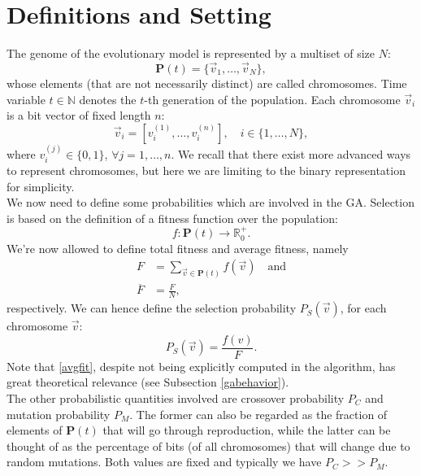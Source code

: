 \documentclass[%
    corpo=11pt,
    twoside,
    stile=classica,
    oldstyle,
    autoretitolo,
    tipotesi=magistrale,
    greek,
    evenboxes,
    english
]{toptesi}
\begin{document}
\section{Definitions and Setting}
The genome of the evolutionary model is represented by a multiset of size $N$:
\begin{equation}
\textbf{P}(t) = \{\vec{v}_1, \dots, \vec{v}_N \},
\end{equation}
whose elements (that are not necessarily distinct) are called chromosomes. Time variable $t\in \mathbb{N}$ denotes the $t$-th generation of the population. Each chromosome $\vec{v}_i$ is a bit vector of fixed length $n$:
\begin{equation}
\vec{v}_i = \left[v_i^{(1)}, \dots, v_i^{(n)} \right], \quad i \in \{1, \dots, N\},
\end{equation}
where $v_i^{(j)} \in \{0,1\}$, $\forall j = 1, \dots, n$. We recall that there exist more advanced ways to represent chromosomes, but here we are limiting to the binary representation for simplicity. \\
We now need to define some probabilities which are involved in the GA. Selection is based on the definition of a fitness function over the population:
\begin{equation}
f: \textbf{P}(t) \longrightarrow \mathbb{R}_0^{+}.
\end{equation}
We're now allowed to define total fitness and average fitness, namely
\begin{align}
F &= \sum_{\vec{v}\in \textbf{P}(t)}f(\vec{v}) \quad \text{and} \\
\overline{F} &= \frac{F}{N}, \label{avgfit}
\end{align}
respectively. We can hence define the selection probability $P_S(\vec{v})$, for each chromosome $\vec{v}$:
\begin{equation}
P_S(\vec{v}) = \frac{f(v)}{F}.
\end{equation}
Note that \eqref{avgfit}, despite not being explicitly computed in the algorithm, has great theoretical relevance (see Subsection \ref{gabehavior}). \\
The other probabilistic quantities involved are crossover probability $P_C$ and mutation probability $P_M$. The former can also be regarded as the fraction of elements of $\textbf{P}(t)$ that will go through reproduction, while the latter can be thought of as the percentage of bits (of all chromosomes) that will change due to random mutations. Both values are fixed and typically we have $P_C >> P_M$.
\newpage
\end{document}
